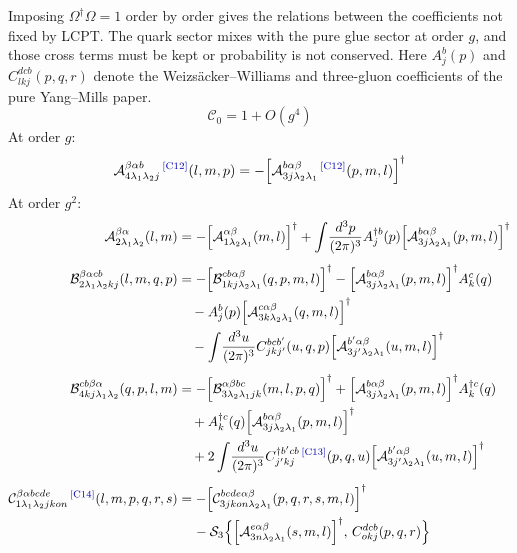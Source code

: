 \documentclass[11pt]{article}
\newcommand{\dg}{\dagger}
\newcommand{\ip}[1]{\int\!\frac{d^{3}#1}{(2\pi)^{3}}}
\newcommand{\OM}{\Omega}
\newcommand{\A}{\mathcal{A}}
\newcommand{\B}{\mathcal{B}}
\newcommand{\C}{\mathcal{C}}
\newcommand{\chg}[1]{{\color{blue!70!black}\textsuperscript{\,[C#1]}}}
\begin{document}
Imposing $\OM^{\dg}\OM=1$ order by order gives the relations between the coefficients not fixed by
LCPT. The quark sector mixes with the pure glue sector at order $g$, and those cross terms must be
kept or probability is not conserved. Here $A^{b}_{j}(p)$ and $C^{dcb}_{lkj}(p,q,r)$ denote the
Weizs\"acker--Williams and three-gluon coefficients of the pure Yang--Mills paper.
\begin{equation}
\C_{0}=1+O(g^{4})
\end{equation}
At order $g$:
\begin{equation}
\A^{\beta\alpha b}_{4\lambda_{1}\lambda_{2}j}\chg{12}(l,m,p)
=-\Big[\A^{b\alpha\beta}_{3j\lambda_{2}\lambda_{1}}\chg{12}(p,m,l)\Big]^{\dg}
\end{equation}
At order $g^{2}$:
\begin{align}
\A^{\beta\alpha}_{2\lambda_{1}\lambda_{2}}(l,m)&=
-\Big[\A^{\alpha\beta}_{1\lambda_{2}\lambda_{1}}(m,l)\Big]^{\dg}
+\ip{p}A^{\dg b}_{j}(p)\Big[\A^{b\alpha\beta}_{3j\lambda_{2}\lambda_{1}}(p,m,l)\Big]^{\dg}
\\[4pt]
\B^{\beta\alpha cb}_{2\lambda_{1}\lambda_{2}kj}(l,m,q,p)&=
-\Big[\B^{cb\alpha\beta}_{1kj\lambda_{2}\lambda_{1}}(q,p,m,l)\Big]^{\dg}
-\Big[\A^{b\alpha\beta}_{3j\lambda_{2}\lambda_{1}}(p,m,l)\Big]^{\dg}A^{c}_{k}(q)
\nonumber\\&\quad
-A^{b}_{j}(p)\Big[\A^{c\alpha\beta}_{3k\lambda_{2}\lambda_{1}}(q,m,l)\Big]^{\dg}
\nonumber\\
&\quad-\ip{u}C^{bcb'}_{jkj'}(u,q,p)\Big[\A^{b'\alpha\beta}_{3j'\lambda_{2}\lambda_{1}}(u,m,l)\Big]^{\dg}
\\[4pt]
\B^{cb\beta\alpha}_{4kj\lambda_{1}\lambda_{2}}(q,p,l,m)&=
-\Big[\B^{\alpha\beta bc}_{3\lambda_{2}\lambda_{1}jk}(m,l,p,q)\Big]^{\dg}
+\Big[\A^{b\alpha\beta}_{3j\lambda_{2}\lambda_{1}}(p,m,l)\Big]^{\dg}A^{\dg c}_{k}(q)
\nonumber\\&\quad
+A^{\dg c}_{k}(q)\Big[\A^{b\alpha\beta}_{3j\lambda_{2}\lambda_{1}}(p,m,l)\Big]^{\dg}
\nonumber\\
&\quad+2\ip{u}C^{\dg b'cb}_{j'kj}\chg{13}(p,q,u)
\Big[\A^{b'\alpha\beta}_{3j'\lambda_{2}\lambda_{1}}(u,m,l)\Big]^{\dg}
\\[4pt]
\C^{\beta\alpha bcde}_{1\lambda_{1}\lambda_{2}jkon}\chg{14}(l,m,p,q,r,s)&=
-\Big[\C^{bcde\alpha\beta}_{3jkon\lambda_{2}\lambda_{1}}(p,q,r,s,m,l)\Big]^{\dg}
\nonumber\\&\hspace{0.4cm}
-\mathcal S_{3}\Big\{\Big[\A^{e\alpha\beta}_{3n\lambda_{2}\lambda_{1}}(s,m,l)\Big]^{\dg},
\,C^{dcb}_{okj}(p,q,r)\Big\}

\end{align}
\end{document}
